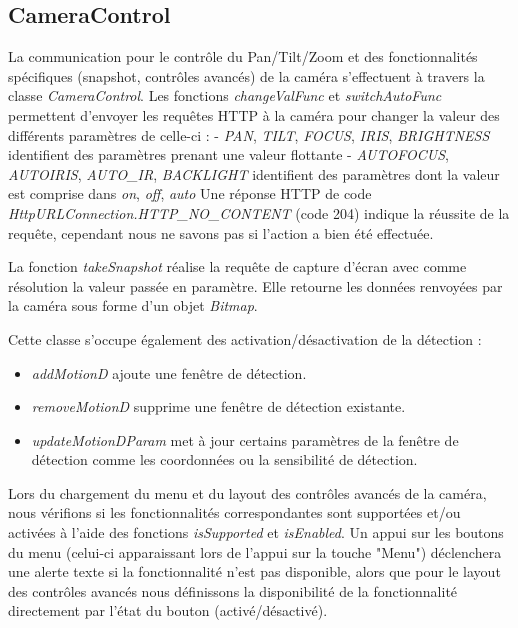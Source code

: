 \subsection{CameraControl}
La communication pour le contrôle du Pan/Tilt/Zoom et des fonctionnalités spécifiques (snapshot, contrôles avancés) de la caméra s'effectuent à travers la classe \textit{CameraControl}.
Les fonctions \textit{changeValFunc} et \textit{switchAutoFunc} permettent d'envoyer les requêtes HTTP à la caméra pour changer la valeur des différents paramètres de celle-ci :
- \textit{PAN}, \textit{TILT}, \textit{FOCUS}, \textit{IRIS}, \textit{BRIGHTNESS} identifient des paramètres prenant une valeur flottante
- \textit{AUTOFOCUS}, \textit{AUTOIRIS}, \textit{AUTO\_IR}, \textit{BACKLIGHT}
identifient des paramètres dont la valeur est comprise dans { \textit{on}, \textit{off}, \textit{auto} } Une réponse HTTP de code \textit{HttpURLConnection.HTTP\_NO\_CONTENT} (code 204)
indique la réussite de la requête, cependant nous ne savons pas si l'action a bien été effectuée.

La fonction \textit{takeSnapshot} réalise la requête de capture d'écran avec comme résolution la valeur passée en paramètre.
Elle retourne les données renvoyées par la caméra sous forme d'un objet \textit{Bitmap}.

Cette classe s'occupe également des activation/désactivation de la détection :
\begin{itemize}
	\item \textit{addMotionD} ajoute une fenêtre de détection.
	\item \textit{removeMotionD} supprime une fenêtre de détection existante.
	\item \textit{updateMotionDParam} met à jour certains paramètres de la fenêtre
	de détection comme les coordonnées ou la sensibilité de détection.
\end{itemize}

Lors du chargement du menu et du layout des contrôles avancés de la caméra, nous vérifions si les fonctionnalités correspondantes sont supportées et/ou activées à l'aide des fonctions
\textit{isSupported} et \textit{isEnabled}. Un appui sur les boutons du menu (celui-ci apparaissant lors de l'appui sur la touche "Menu") déclenchera une alerte texte si la fonctionnalité n'est pas
disponible, alors que pour le layout des contrôles avancés nous définissons la disponibilité de la fonctionnalité directement par l'état du bouton (activé/désactivé).

